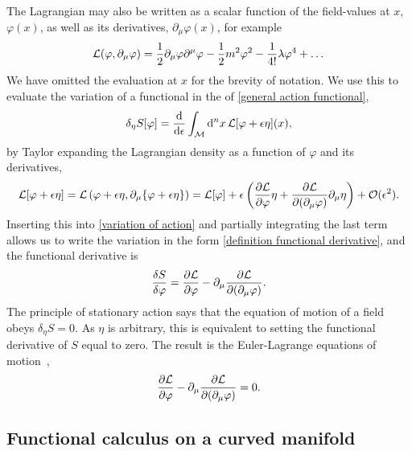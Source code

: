 The Lagrangian may also be written as a scalar function of the field-values at $x$, $\varphi(x)$, as well as its derivatives, $\partial_\mu \varphi(x)$, for example
%
\begin{equation}
    \mathcal{L}(\varphi, \partial_\mu \varphi) = \frac{1}{2} \partial_\mu \varphi \partial^\mu\varphi - \frac{1}{2} m^2 \varphi^2 - \frac{1}{4!}\lambda \varphi^4+ \dots
\end{equation}
%
We have omitted the evaluation at $x$ for the brevity of notation.
We use this to evaluate the variation of a functional in the of \autoref{general action functional}, 
%
\begin{equation}
    \label{variation of action}
    \delta_\eta S[\varphi] = \odv{}{\epsilon}
    \int_\Em \dd^n x \, \Ell[\varphi + \epsilon \eta](x),
\end{equation}
%
by Taylor expanding the Lagrangian density as a function of $\varphi$ and its derivatives,
%
\begin{equation}
    \mathcal{L}[\varphi + \epsilon \eta]
    = \mathcal{L}
    \left(
        \varphi + \epsilon \eta, \partial_\mu\{\varphi + \epsilon \eta\}
    \right)
     = 
    \mathcal{L}[\varphi]
    +
    \epsilon
    \left(
        \pdv{\mathcal{L}}{\varphi} \eta 
        + \pdv{\mathcal{L}}{(\partial_\mu \varphi)}\partial_\mu\eta 
    \right) + \mathcal O(\epsilon^2).
\end{equation}
%
Inserting this into \autoref{variation of action} and partially integrating the last term allows us to write the variation in the form \autoref{definition functional derivative}, and the functional derivative is
%
\begin{equation}
    \fdv{S}{\varphi} = \pdv{\Ell}{\varphi} - \partial_\mu \pdv{\Ell}{(\partial_\mu \varphi)}.
\end{equation}
%
The principle of stationary action says that the equation of motion of a field obeys $\delta_\eta S = 0$.
As $\eta$ is arbitrary, this is equivalent to setting the functional derivative of $S$ equal to zero.
The result is the Euler-Lagrange equations of motion~\autocite{schwartzQuantumFieldTheory2013},
%
\begin{equation}
    \pdv{\mathcal{L}}{\varphi} 
    -
    \partial_\mu \pdv{\mathcal{L}}{(\partial_\mu \varphi)}
    = 0.
\end{equation}


\subsection{Functional calculus on a curved manifold}
\label{subsection: functional calculus on a curved manifold}

